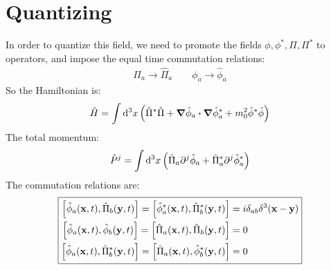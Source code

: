 \documentclass[12pt]{article}
\newcommand{\D}{\partial}
\newcommand{\phis}{\phi^*}
\newcommand{\phih}{\hat{\phi}}
\newcommand{\phish}{\hat{\phi}^*}
\newcommand{\pih}{\hat{\Pi}}
\newcommand{\pish}{\hat{\Pi}^*}
\begin{document}
\section{Quantizing}
In order to quantize this field, we need to promote the fields $\phi,\phis,\Pi,\Pi^*$ to operators, and impose the equal time commutation relations:
\begin{align*}
  \Pi_a\to\pih_a\qquad\phi_a\to\phih_a
\end{align*}
So the Hamiltonian is:
\begin{align*}
  \hat{H}=\int\dd[3]{x}\qty(\pish\pih+\grad{\phih_a}\vdot\grad{\phish_a}+
  m_0^2\phish\phih)
\end{align*}
The total momentum:
\begin{align*}
  \hat{P}^j=\int\dd[3]{x}\qty(\pih_a\D^j\phih_a+\pish_a\D^j\phish_a)
\end{align*}
The commutation relations are:
\begin{equation*}
    \boxed{
      \begin{aligned}
        \comm{\phih_a(\vb{x},t)}{\pih_b(\vb{y},t)}=
        \comm{\phish_a(\vb{x},t)}{\pish_b(\vb{y},t)}&=
        i\delta_{ab}\delta^3(\vb{x}-\vb{y})\\
        \comm{\phih_a(\vb{x},t)}{\phih_b(\vb{y},t)}=
        \comm{\pih_a(\vb{x},t)}{\pih_b(\vb{y},t)}&=0 \\
        \comm{\phih_a(\vb{x},t)}{\pish_b(\vb{y},t)}=
        \comm{\pih_a(\vb{x},t)}{\phish_b(\vb{y},t)}&=0
      \end{aligned}
    }
\end{equation*}
\end{document}
